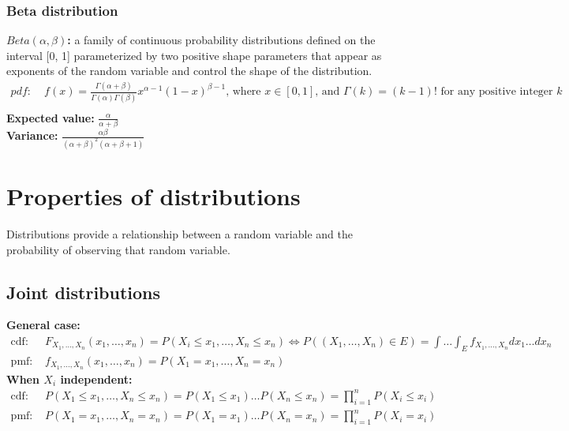 \documentclass{article}
\begin{document}
\subsubsection{Beta distribution}
\textbf{$Beta(\alpha, \beta)$:} a family of continuous probability distributions defined on the interval [0, 1] parameterized by two positive shape parameters that appear as exponents of the random variable and control the shape of the distribution.
\begin{align*}
    pdf: & \; f(x) = \frac{\Gamma(\alpha + \beta)}{\Gamma(\alpha) \Gamma(\beta)} x^{\alpha - 1} (1-x)^{\beta - 1} \textrm{, where } x \in [0, 1] \textrm{, and } \Gamma(k) = (k - 1)! \textrm{ for any positive integer } k\\
\end{align*}
\textbf{Expected value:} $\frac{\alpha}{\alpha + \beta}$\\
\textbf{Variance:} $\frac{\alpha \beta}{(\alpha + \beta)^2(\alpha + \beta + 1)}$

\section{Properties of distributions}
Distributions provide a relationship between a random variable and the probability of observing that random variable.

\subsection{Joint distributions}
\textbf{General case:}
\begin{align*}
    \textrm{cdf: } &F_{X_1,\dots,X_n}(x_1, \dots, x_n) = P(X_i \leq x_1, \dots, X_n \leq x_n) \Longleftrightarrow P((X_1, \dots, X_n)\in E) = \int \dots \int_E f_{X_1,\dots,X_n}dx_1\dots dx_n\\
    \textrm{pmf: } &f_{X_1,\dots,X_n}(x_1, \dots, x_n) = P(X_1=x_1, \dots, X_n = x_n)
\end{align*}
\textbf{When $X_i$ independent:}
\begin{align*}
    \textrm{cdf: } & P(X_1\leq x_1, \dots, X_n \leq x_n) = P(X_1\leq x_1)\dots P(X_n\leq x_n) = \prod_{i=1}^n P(X_i \leq x_i)\\
    \textrm{pmf: } & P(X_1= x_1, \dots, X_n = x_n) = P(X_1=x_1)\dots P(X_n=x_n) = \prod_{i=1}^nP(X_i = x_i)\\
\end{align*}
\end{document}
